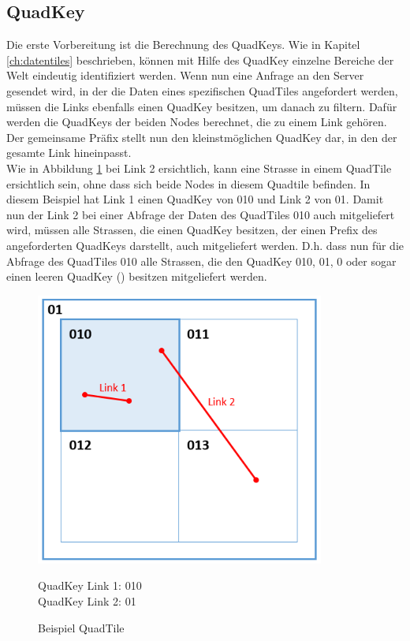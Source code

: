 \subsection{QuadKey}
Die erste Vorbereitung ist die Berechnung des QuadKeys. Wie in Kapitel \ref{ch:datentiles}  beschrieben, können mit Hilfe des QuadKey einzelne Bereiche der Welt eindeutig identifiziert werden. Wenn nun eine Anfrage an den Server gesendet wird, in der die Daten eines spezifischen QuadTiles angefordert werden, müssen die Links ebenfalls einen QuadKey besitzen, um danach zu filtern. Dafür werden die QuadKeys der beiden Nodes berechnet, die zu einem Link gehören. Der gemeinsame Präfix stellt nun den kleinstmöglichen QuadKey dar, in den der gesamte Link hineinpasst.\\
Wie in Abbildung \ref{pic:example_quadtile} bei Link 2 ersichtlich, kann eine Strasse in einem QuadTile ersichtlich sein, ohne dass sich beide Nodes in diesem Quadtile befinden. In diesem Beispiel hat Link 1 einen QuadKey von 010 und Link 2 von 01. Damit nun der Link 2 bei einer Abfrage der Daten des QuadTiles 010 auch mitgeliefert wird, müssen alle Strassen, die einen QuadKey besitzen, der einen Prefix des angeforderten QuadKeys darstellt, auch mitgeliefert werden. D.h. dass nun für die Abfrage des QuadTiles 010 alle Strassen, die den QuadKey 010, 01, 0 oder sogar einen leeren QuadKey (\glqq{}\grqq{}) besitzen mitgeliefert werden.
\begin{figure}[H]
\centering
\includegraphics[height=9cm]{images/QuadTile_example.PNG}
\caption{Beispiel QuadTile}
QuadKey Link 1: 010\\QuadKey Link 2: 01
\label{pic:example_quadtile}
\end{figure}
